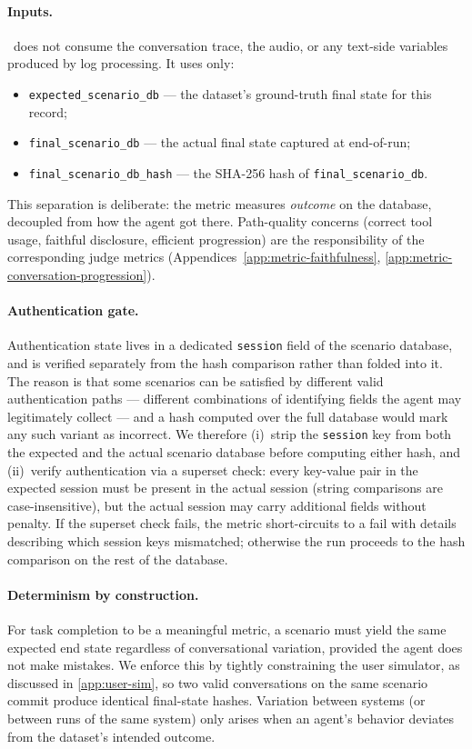 \paragraph{Inputs.} \metrictaskcompletion~does not consume the conversation trace, the audio, or any text-side variables produced by log processing. It uses only:
\begin{itemize}
    \item \texttt{expected\_scenario\_db} --- the dataset's ground-truth final state for this record;
    \item \texttt{final\_scenario\_db} --- the actual final state captured at end-of-run;
    \item \texttt{final\_scenario\_db\_hash} --- the SHA-256 hash of \texttt{final\_scenario\_db}.
\end{itemize}
This separation is deliberate: the metric measures \emph{outcome} on the database, decoupled from how the agent got there. Path-quality concerns (correct tool usage, faithful disclosure, efficient progression) are the responsibility of the corresponding judge metrics (Appendices~\ref{app:metric-faithfulness}, \ref{app:metric-conversation-progression}).

\paragraph{Authentication gate.} Authentication state lives in a dedicated \texttt{session} field of the scenario database, and is verified separately from the hash comparison rather than folded into it. The reason is that some scenarios can be satisfied by different valid authentication paths --- different combinations of identifying fields the agent may legitimately collect --- and a hash computed over the full database would mark any such variant as incorrect. We therefore (i)~strip the \texttt{session} key from both the expected and the actual scenario database before computing either hash, and (ii)~verify authentication via a superset check: every key-value pair in the expected session must be present in the actual session (string comparisons are case-insensitive), but the actual session may carry additional fields without penalty. If the superset check fails, the metric short-circuits to a fail with details describing which session keys mismatched; otherwise the run proceeds to the hash comparison on the rest of the database.

\paragraph{Determinism by construction.} For task completion to be a meaningful metric, a scenario must yield the same expected end state regardless of conversational variation, provided the agent does not make mistakes. We enforce this by tightly constraining the user simulator, as discussed in \ref{app:user-sim}, so two valid conversations on the same scenario commit produce identical final-state hashes. Variation between systems (or between runs of the same system) only arises when an agent's behavior deviates from the dataset's intended outcome.

